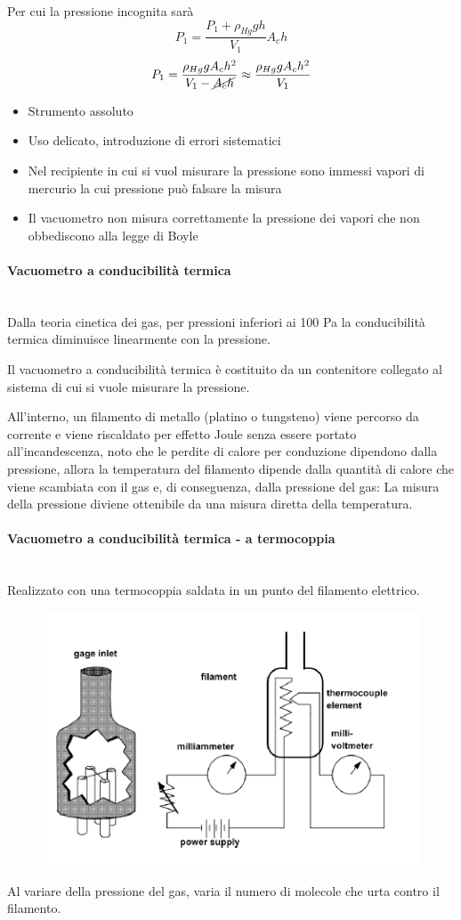\documentclass[a4paper, 15pt]{article}
\newcommand{\xmark}{\ding{55}}
\begin{document}
\begin{adjustwidth}{2in}{}
		Per cui la pressione incognita sarà
		\[P_1 = \dfrac{P_1+\rho_{Hg}gh}{V_1}A_ch\]
		\[P_1 = \dfrac{\rho_{Hg}gA_ch^2}{V_1-\cancel{A_ch}} \approx \dfrac{\rho_{Hg}gA_ch^2}{V_1}\]
		\begin{itemize}[label=\textcolor{red}{\xmark}]
			\item Strumento assoluto 
			\item Uso delicato, introduzione di errori sistematici
			\item Nel recipiente in cui si vuol misurare la pressione sono immessi vapori di mercurio la cui pressione può falsare la misura
			\item Il vacuometro non misura correttamente la pressione dei vapori che non obbediscono alla legge di Boyle
		\end{itemize}
		
\paragraph{Vacuometro a conducibilità termica} \mbox{} \\
		Dalla teoria cinetica dei gas, per pressioni inferiori ai 100 Pa la conducibilità termica diminuisce linearmente con la pressione.
				
		Il vacuometro a conducibilità termica è costituito da un contenitore collegato al sistema di cui si vuole misurare la pressione. 
		
		All'interno, un filamento di metallo (platino o tungsteno) viene percorso da corrente e viene riscaldato per effetto Joule senza essere portato  all'incandescenza, noto che le perdite di calore per conduzione dipendono dalla pressione, allora la temperatura del filamento dipende dalla quantità di calore che viene scambiata con il gas e, di conseguenza, dalla pressione del gas:
		La misura della pressione diviene ottenibile da una misura diretta della temperatura. \newline 
		
		
\paragraph{Vacuometro a conducibilità termica - a termocoppia} \mbox{} \\
		Realizzato con una termocoppia saldata in un punto del filamento elettrico.
		\begin{figure}[H]
			\centering
			\includegraphics[width=0.5\linewidth]{immagini/manometro15}
			\label{fig:manometro15}
		\end{figure}
		Al variare della pressione del gas, varia il numero di molecole che urta contro il filamento. 
		

\end{adjustwidth}
\end{document}
